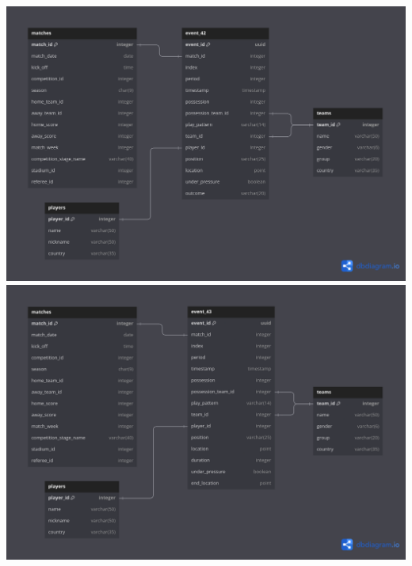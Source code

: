 \documentclass[12pt]{article}
\begin{document}
\includegraphics[width=\textwidth]{schema-diagram/event_42.png}
\includegraphics[width=\textwidth]{schema-diagram/event_43.png}
\end{document}
